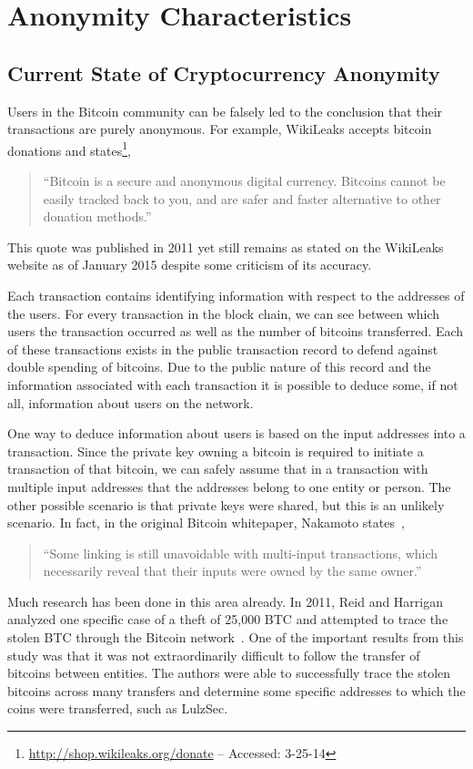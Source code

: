 \documentclass[11pt]{article}
\begin{document}
\section{Anonymity Characteristics}
\subsection{Current State of Cryptocurrency Anonymity}
Users in the Bitcoin community can be falsely led to the conclusion that their transactions are purely anonymous. For
example, WikiLeaks accepts bitcoin donations and states\footnote{\url{http://shop.wikileaks.org/donate} -- Accessed:
3-25-14},
\begin{quote}
    ``Bitcoin is a secure and anonymous digital currency. Bitcoins cannot be easily tracked back to you, and are safer
    and faster alternative to other donation methods.''
\end{quote}
This quote was published in 2011 yet still remains as stated on the WikiLeaks website as of January 2015 despite some
criticism of its accuracy.

Each transaction contains identifying information with respect to the addresses of the users. For every transaction in
the block chain, we can see between which users the transaction occurred as well as the number of bitcoins transferred.
Each of these transactions exists in the public transaction record to defend against double spending of bitcoins. Due to
the public nature of this record and the information associated with each transaction it is possible to deduce some, if
not all, information about users on the network.

One way to deduce information about users is based on the input addresses into a transaction. Since the private key
owning a bitcoin is required to initiate a transaction of that bitcoin, we can safely assume that in a transaction with
multiple input addresses that the addresses belong to one entity or person. The other possible scenario is that private
keys were shared, but this is an unlikely scenario. In fact, in the original Bitcoin whitepaper, Nakamoto
states~\cite{nakamoto08},
    \begin{quote}
        ``Some linking is still unavoidable with multi-input transactions, which
        necessarily reveal that their inputs were owned by the same owner.''
    \end{quote}

Much research has been done in this area already. In 2011, Reid and Harrigan analyzed one specific case of a theft of
25,000 BTC and attempted to trace the stolen BTC through the Bitcoin network~\cite{reid11}. One of the important results
from this study was that it was not extraordinarily difficult to follow the transfer of bitcoins between entities. The
authors were able to successfully trace the stolen bitcoins across many transfers and determine some specific addresses
to which the coins were transferred, such as LulzSec.
\end{document}
